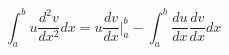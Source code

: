 \begin{equation}
\int_{a}^{b}u\frac{d^{2}v}{dx^{2}} dx=u\frac{dv}{dx}|_{a}^{b}-\int_{a}^{b}\frac{du}{dx}\frac{dv}{dx} dx
 \end{equation}